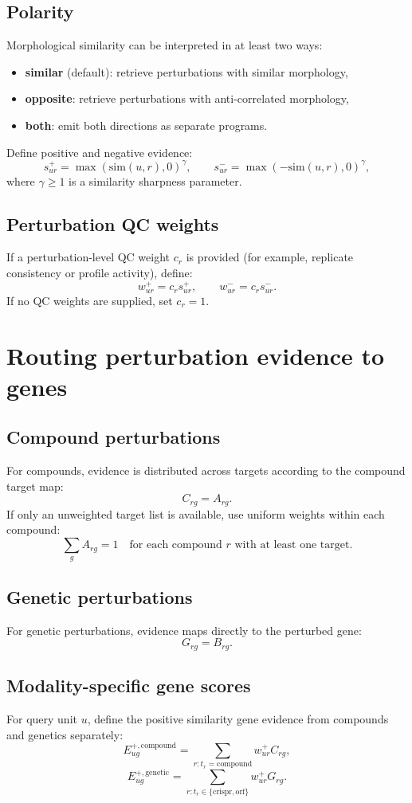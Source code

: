\documentclass[11pt]{article}
\begin{document}
\subsection{Polarity}
Morphological similarity can be interpreted in at least two ways:
\begin{itemize}[leftmargin=2em]
\item \textbf{similar} (default): retrieve perturbations with similar morphology,
\item \textbf{opposite}: retrieve perturbations with anti-correlated morphology,
\item \textbf{both}: emit both directions as separate programs.
\end{itemize}

Define positive and negative evidence:
\[
s^+_{ur} = \max(\mathrm{sim}(u,r), 0)^\gamma, \qquad
s^-_{ur} = \max(-\mathrm{sim}(u,r), 0)^\gamma,
\]
where $\gamma \ge 1$ is a similarity sharpness parameter.

\subsection{Perturbation QC weights}
If a perturbation-level QC weight $c_r$ is provided (for example, replicate consistency or profile activity), define:
\[
w^{+}_{ur} = c_r s^+_{ur}, \qquad
w^{-}_{ur} = c_r s^-_{ur}.
\]
If no QC weights are supplied, set $c_r = 1$.

\section{Routing perturbation evidence to genes}
\subsection{Compound perturbations}
For compounds, evidence is distributed across targets according to the compound target map:
\[
C_{rg} = A_{rg}.
\]
If only an unweighted target list is available, use uniform weights within each compound:
\[
\sum_g A_{rg} = 1 \quad \text{for each compound } r \text{ with at least one target.}
\]

\subsection{Genetic perturbations}
For genetic perturbations, evidence maps directly to the perturbed gene:
\[
G_{rg} = B_{rg}.
\]

\subsection{Modality-specific gene scores}
For query unit $u$, define the positive similarity gene evidence from compounds and genetics separately:
\[
E^{+,\mathrm{compound}}_{ug} = \sum_{r : t_r = \mathrm{compound}} w^+_{ur} C_{rg},
\]
\[
E^{+,\mathrm{genetic}}_{ug} = \sum_{r : t_r \in \{\mathrm{crispr}, \mathrm{orf}\}} w^+_{ur} G_{rg}.
\]
\end{document}
